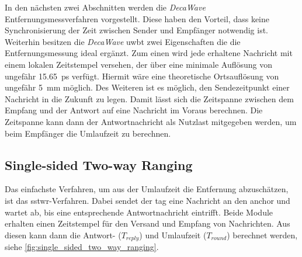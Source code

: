 In den nächsten zwei Abschnitten werden die \textit{DecaWave} Entfernungsmessverfahren vorgestellt. Diese haben den Vorteil, dass keine Synchronisierung der Zeit zwischen Sender und Empfänger notwendig ist. Weiterhin besitzen die \textit{DecaWave} \Gls{uwbt} zwei Eigenschaften die die Entfernungsmessung ideal ergänzt. Zum einen wird jede erhaltene Nachricht mit einem lokalen Zeitstempel versehen, der über eine minimale Auflösung von ungefähr \SI{15.65}{\pico\second} verfügt. Hiermit wäre eine theoretische Ortsauflösung von ungefähr \SI{5}{\milli\metre} möglich. Des Weiteren ist es möglich, den Sendezeitpunkt einer Nachricht in die Zukunft zu legen. Damit lässt sich die Zeitspanne zwischen dem Empfang und der Antwort auf eine Nachricht im Voraus berechnen. Die Zeitspanne kann dann der Antwortnachricht als Nutzlast mitgegeben werden, um beim Empfänger die Umlaufzeit zu berechnen.


%
%
\subsection{Single-sided Two-way Ranging}

Das einfachste Verfahren, um aus der Umlaufzeit die Entfernung abzuschätzen, ist das \Gls{sstwr}-Verfahren. Dabei sendet der \Gls{tag} eine Nachricht an den \Gls{anchor} und wartet ab, bis eine entsprechende Antwortnachricht eintrifft. Beide Module erhalten einen Zeitstempel für den Versand und Empfang von Nachrichten. Aus diesen kann dann die Antwort- ($T_{reply}$) und Umlaufzeit ($T_{round}$) berechnet werden, siehe \autoref{fig:single_sided_two_way_ranging}. \cite{decawave2015twr, decawave2016dw1kusermanual}

